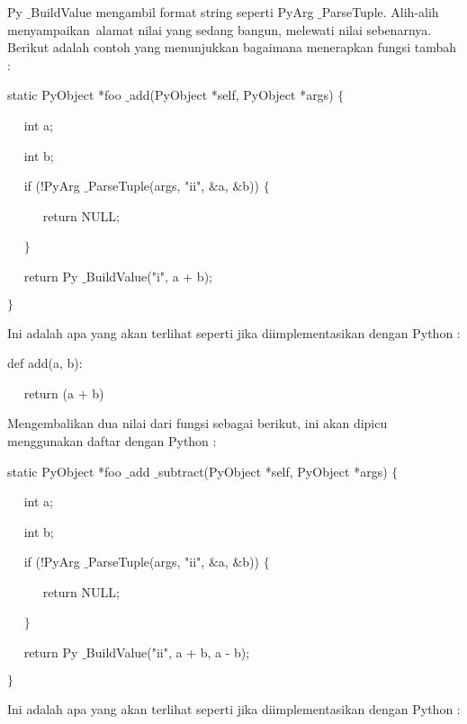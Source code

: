 \documentclass{wileySix}
\begin{document}
\begin{myEnumerate}
{\begin{myEnumerate}
\vspace{12pt}
\vspace{14pt}
Py $  \_  $BuildValue mengambil format string seperti PyArg $  \_  $ParseTuple. Alih-alih menyampaikan~alamat nilai yang sedang  bangun, melewati nilai sebenarnya. Berikut adalah contoh yang menunjukkan bagaimana menerapkan fungsi tambah : \par
\noindent 
static PyObject *foo $  \_  $add(PyObject *self, PyObject *args)  $  \{  $ \par
\noindent 
~~ int a; \par
\noindent 
~~ int b; \par
\vspace{12pt}
\noindent 
~~ if (!PyArg $  \_  $ParseTuple(args, "ii",  $  \&  $a,  $  \&  $b))  $  \{  $ \par
\noindent 
~~~~~ return NULL; \par
\noindent 
~~  $  \}  $ \par
\noindent 
~~ return Py $  \_  $BuildValue("i", a + b); \par
\noindent 
$  \}  $ \par
\vspace{14pt}
Ini adalah apa yang akan terlihat seperti jika diimplementasikan dengan Python : \par
\noindent 
def add(a, b): \par
\noindent 
~~ return (a + b) \par
\vspace{16pt}
Mengembalikan dua nilai dari fungsi sebagai berikut, ini akan dipicu menggunakan daftar dengan Python : \par
\noindent 
static PyObject *foo $  \_  $add $  \_  $subtract(PyObject *self, PyObject *args)  $  \{  $ \par
\noindent 
~~ int a; \par
\noindent 
~~ int b; \par
\vspace{12pt}
\noindent 
~~ if (!PyArg $  \_  $ParseTuple(args, "ii",  $  \&  $a,  $  \&  $b))  $  \{  $ \par
\noindent 
~~~~~ return NULL; \par
\noindent 
~~  $  \}  $ \par
\noindent 
~~ return Py $  \_  $BuildValue("ii", a + b, a - b); \par
\noindent 
$  \}  $ \par
\vspace{16pt}
Ini adalah apa yang akan terlihat seperti jika diimplementasikan dengan Python : \par

\end{myEnumerate}}
\end{myEnumerate}
\end{document}
